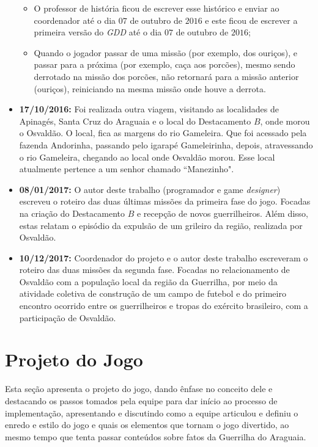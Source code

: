 \begin{itemize}
\begin{itemize}
		\item O professor de história ficou de escrever esse histórico e enviar ao coordenador até o dia $07$ de outubro de $2016$ e este ficou de escrever a primeira versão do \textit{GDD} até o dia $07$ de outubro de $2016$;
		
		\item Quando o jogador passar de uma missão (por exemplo, dos ouriços), e passar para a próxima (por exemplo, caça aos porcões), mesmo sendo derrotado na missão dos porcões, não retornará para a missão anterior (ouriços), reiniciando na mesma missão onde houve a derrota.
	\end{itemize}

	\item \textbf{17/10/2016:} Foi realizada outra viagem, visitando as localidades de Apinagés, Santa Cruz do Araguaia e o local do Destacamento $B$, onde morou o Osvaldão. O local, fica as margens do rio Gameleira. Que foi acessado pela fazenda Andorinha, passando pelo igarapé Gameleirinha, depois, atravessando o rio Gameleira, chegando ao local onde Osvaldão morou. Esse local atualmente pertence a um senhor chamado ``Manezinho".
	
	\item \textbf{08/01/2017:} O autor deste trabalho (programador e game \textit{designer}) escreveu o roteiro das duas últimas missões da primeira fase do jogo. Focadas na criação do Destacamento $B$ e recepção de novos guerrilheiros. Além disso, estas relatam o episódio da expulsão de um grileiro da região, realizada por Osvaldão.
	
	\item \textbf{10/12/2017:} Coordenador do projeto e o autor deste trabalho escreveram o roteiro das duas missões da segunda fase. Focadas no relacionamento de Osvaldão com a população local da região da Guerrilha, por meio da atividade coletiva de construção de um campo de futebol e do primeiro encontro ocorrido entre os guerrilheiros e tropas do exército brasileiro, com a participação de Osvaldão.
	
\end{itemize}
 
\section{Projeto do Jogo}
\label{sec:projeto}

Esta seção apresenta o projeto do jogo, dando ênfase no conceito dele e destacando os passos tomados pela equipe para dar início ao processo de implementação, apresentando e discutindo como a equipe articulou e definiu o enredo e estilo do jogo e quais os elementos que tornam o jogo divertido, ao mesmo tempo que tenta passar conteúdos sobre fatos da Guerrilha do Araguaia.

